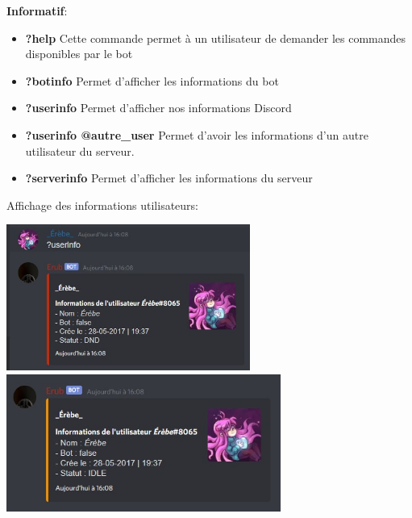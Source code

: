 {\bf Informatif}: 
    \begin{itemize}
        \item{\bf ?help}  Cette commande permet à un utilisateur de demander les commandes disponibles par le bot
        
        \item {\bf ?botinfo} Permet d'afficher les informations du bot
        
        \item {\bf ?userinfo} Permet d'afficher nos informations Discord 
        
        \item {\bf ?userinfo @autre\_user} Permet d'avoir les informations d'un autre utilisateur du serveur.
        
        \item {\bf ?serverinfo} Permet d'afficher les informations du serveur

    \end{itemize}
    
    Affichage des informations utilisateurs: 
    
    \includegraphics[width=8cm]{img/userinfo_dnd.jpg}\includegraphics[width=9cm]{img/userinfo_idle.jpg}
    
